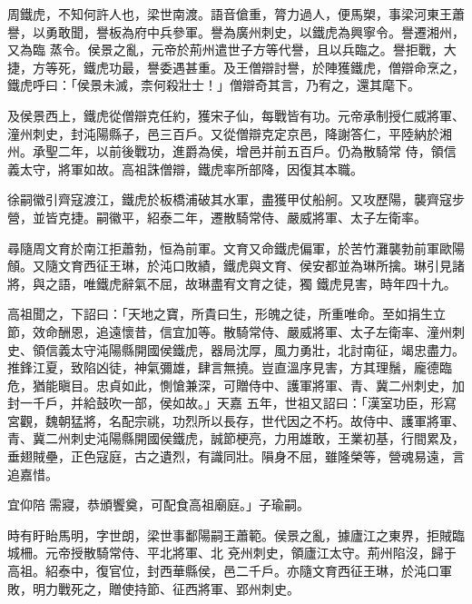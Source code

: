 
\begin{pinyinscope}

 周鐵虎，不知何許人也，梁世南渡。語音傖重，膂力過人，便馬槊，事梁河東王蕭譽，以勇敢聞，譽板為府中兵參軍。譽為廣州刺史，以鐵虎為興寧令。譽遷湘州，又為臨
 蒸令。侯景之亂，元帝於荊州遣世子方等代譽，且以兵臨之。譽拒戰，大捷，方等死，鐵虎功最，譽委遇甚重。及王僧辯討譽，於陣獲鐵虎，僧辯命烹之，鐵虎呼曰：「侯景未滅，柰何殺壯士！」僧辯奇其言，乃宥之，還其麾下。



 及侯景西上，鐵虎從僧辯克任約，獲宋子仙，每戰皆有功。元帝承制授仁威將軍、潼州刺史，封沌陽縣子，邑三百戶。又從僧辯克定京邑，降謝答仁，平陸納於湘州。承聖二年，以前後戰功，進爵為侯，增邑并前五百戶。仍為散騎常
 侍，領信義太守，將軍如故。高祖誅僧辯，鐵虎率所部降，因復其本職。



 徐嗣徽引齊寇渡江，鐵虎於板橋浦破其水軍，盡獲甲仗船舸。又攻歷陽，襲齊寇步營，並皆克捷。嗣徽平，紹泰二年，遷散騎常侍、嚴威將軍、太子左衛率。



 尋隨周文育於南江拒蕭勃，恒為前軍。文育又命鐵虎偏軍，於苦竹灘襲勃前軍歐陽頠。又隨文育西征王琳，於沌口敗績，鐵虎與文育、侯安都並為琳所擒。琳引見諸將，與之語，唯鐵虎辭氣不屈，故琳盡宥文育之徒，獨
 鐵虎見害，時年四十九。



 高祖聞之，下詔曰：「天地之寶，所貴曰生，形魄之徒，所重唯命。至如捐生立節，效命酬恩，追遠懷昔，信宜加等。散騎常侍、嚴威將軍、太子左衛率、潼州刺史、領信義太守沌陽縣開國侯鐵虎，器局沈厚，風力勇壯，北討南征，竭忠盡力。推鋒江夏，致陷凶徒，神氣彌雄，肆言無撓。豈直溫序見害，方其理鬚，龐德臨危，猶能瞋目。忠貞如此，惻愴兼深，可贈侍中、護軍將軍、青、冀二州刺史，加封一千戶，并給鼓吹一部，侯如故。」天嘉
 五年，世祖又詔曰：「漢室功臣，形寫宮觀，魏朝猛將，名配宗祧，功烈所以長存，世代因之不朽。故侍中、護軍將軍、青、冀二州刺史沌陽縣開國侯鐵虎，誠節梗亮，力用雄敢，王業初基，行間累及，垂翅賊壘，正色寇庭，古之遺烈，有識同壯。隕身不屈，雖隆榮等，營魂易遠，言追嘉惜。



 宜仰陪需寢，恭頒饗奠，可配食高祖廟庭。」子瑜嗣。



 時有盱眙馬明，字世朗，梁世事鄱陽嗣王蕭範。侯景之亂，據廬江之東界，拒賊臨城柵。元帝授散騎常侍、平北將軍、北
 兗州刺史，領廬江太守。荊州陷沒，歸于高祖。紹泰中，復官位，封西華縣侯，邑二千戶。亦隨文育西征王琳，於沌口軍敗，明力戰死之，贈使持節、征西將軍、郢州刺史。




\end{pinyinscope}
